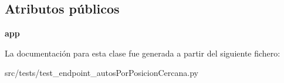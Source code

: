 \subsection*{Atributos públicos}
\begin{DoxyCompactItemize}
\item 
\hypertarget{classsrc_1_1tests_1_1test__endpoint__autos_por_posicion_cercana_1_1_test_endpoint_autos_por_posicion_cercana_aeb3b20e83a148ecec20d537719adea86}{{\bfseries app}}\label{classsrc_1_1tests_1_1test__endpoint__autos_por_posicion_cercana_1_1_test_endpoint_autos_por_posicion_cercana_aeb3b20e83a148ecec20d537719adea86}

\end{DoxyCompactItemize}


La documentación para esta clase fue generada a partir del siguiente fichero\-:\begin{DoxyCompactItemize}
\item 
src/tests/test\-\_\-endpoint\-\_\-autos\-Por\-Posicion\-Cercana.\-py\end{DoxyCompactItemize}
